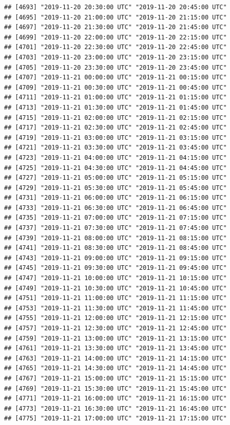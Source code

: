 \documentclass{article}\usepackage[]{graphicx}\usepackage[]{color}
\makeatletter
\newenvironment{kframe}{%
 \def\at@end@of@kframe{}%
 \ifinner\ifhmode%
  \def\at@end@of@kframe{\end{minipage}}%
  \begin{minipage}{\columnwidth}%
 \fi\fi%
 \def\FrameCommand##1{\hskip\@totalleftmargin \hskip-\fboxsep
 \colorbox{shadecolor}{##1}\hskip-\fboxsep
     \hskip-\linewidth \hskip-\@totalleftmargin \hskip\columnwidth}%
 \MakeFramed {\advance\hsize-\width
   \@totalleftmargin\z@ \linewidth\hsize
   \@setminipage}}%
 {\par\unskip\endMakeFramed%
 \at@end@of@kframe}
\newenvironment{knitrout}{}{} %
\makeatother
\begin{document}
\begin{knitrout}
\begin{kframe}
\begin{verbatim}
## [4693] "2019-11-20 20:30:00 UTC" "2019-11-20 20:45:00 UTC"
## [4695] "2019-11-20 21:00:00 UTC" "2019-11-20 21:15:00 UTC"
## [4697] "2019-11-20 21:30:00 UTC" "2019-11-20 21:45:00 UTC"
## [4699] "2019-11-20 22:00:00 UTC" "2019-11-20 22:15:00 UTC"
## [4701] "2019-11-20 22:30:00 UTC" "2019-11-20 22:45:00 UTC"
## [4703] "2019-11-20 23:00:00 UTC" "2019-11-20 23:15:00 UTC"
## [4705] "2019-11-20 23:30:00 UTC" "2019-11-20 23:45:00 UTC"
## [4707] "2019-11-21 00:00:00 UTC" "2019-11-21 00:15:00 UTC"
## [4709] "2019-11-21 00:30:00 UTC" "2019-11-21 00:45:00 UTC"
## [4711] "2019-11-21 01:00:00 UTC" "2019-11-21 01:15:00 UTC"
## [4713] "2019-11-21 01:30:00 UTC" "2019-11-21 01:45:00 UTC"
## [4715] "2019-11-21 02:00:00 UTC" "2019-11-21 02:15:00 UTC"
## [4717] "2019-11-21 02:30:00 UTC" "2019-11-21 02:45:00 UTC"
## [4719] "2019-11-21 03:00:00 UTC" "2019-11-21 03:15:00 UTC"
## [4721] "2019-11-21 03:30:00 UTC" "2019-11-21 03:45:00 UTC"
## [4723] "2019-11-21 04:00:00 UTC" "2019-11-21 04:15:00 UTC"
## [4725] "2019-11-21 04:30:00 UTC" "2019-11-21 04:45:00 UTC"
## [4727] "2019-11-21 05:00:00 UTC" "2019-11-21 05:15:00 UTC"
## [4729] "2019-11-21 05:30:00 UTC" "2019-11-21 05:45:00 UTC"
## [4731] "2019-11-21 06:00:00 UTC" "2019-11-21 06:15:00 UTC"
## [4733] "2019-11-21 06:30:00 UTC" "2019-11-21 06:45:00 UTC"
## [4735] "2019-11-21 07:00:00 UTC" "2019-11-21 07:15:00 UTC"
## [4737] "2019-11-21 07:30:00 UTC" "2019-11-21 07:45:00 UTC"
## [4739] "2019-11-21 08:00:00 UTC" "2019-11-21 08:15:00 UTC"
## [4741] "2019-11-21 08:30:00 UTC" "2019-11-21 08:45:00 UTC"
## [4743] "2019-11-21 09:00:00 UTC" "2019-11-21 09:15:00 UTC"
## [4745] "2019-11-21 09:30:00 UTC" "2019-11-21 09:45:00 UTC"
## [4747] "2019-11-21 10:00:00 UTC" "2019-11-21 10:15:00 UTC"
## [4749] "2019-11-21 10:30:00 UTC" "2019-11-21 10:45:00 UTC"
## [4751] "2019-11-21 11:00:00 UTC" "2019-11-21 11:15:00 UTC"
## [4753] "2019-11-21 11:30:00 UTC" "2019-11-21 11:45:00 UTC"
## [4755] "2019-11-21 12:00:00 UTC" "2019-11-21 12:15:00 UTC"
## [4757] "2019-11-21 12:30:00 UTC" "2019-11-21 12:45:00 UTC"
## [4759] "2019-11-21 13:00:00 UTC" "2019-11-21 13:15:00 UTC"
## [4761] "2019-11-21 13:30:00 UTC" "2019-11-21 13:45:00 UTC"
## [4763] "2019-11-21 14:00:00 UTC" "2019-11-21 14:15:00 UTC"
## [4765] "2019-11-21 14:30:00 UTC" "2019-11-21 14:45:00 UTC"
## [4767] "2019-11-21 15:00:00 UTC" "2019-11-21 15:15:00 UTC"
## [4769] "2019-11-21 15:30:00 UTC" "2019-11-21 15:45:00 UTC"
## [4771] "2019-11-21 16:00:00 UTC" "2019-11-21 16:15:00 UTC"
## [4773] "2019-11-21 16:30:00 UTC" "2019-11-21 16:45:00 UTC"
## [4775] "2019-11-21 17:00:00 UTC" "2019-11-21 17:15:00 UTC"

\end{verbatim}
\end{kframe}
\end{knitrout}
\end{document}

